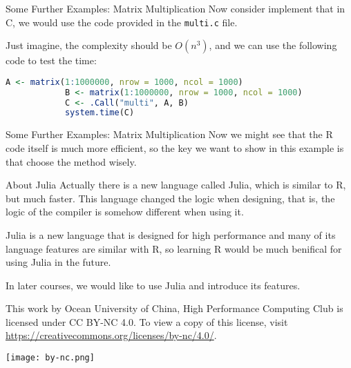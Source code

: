 \documentclass[aspectratio=169]{beamer}
\begin{document}
    \begin{frame}[fragile]{Some Further Examples: Matrix Multiplication}
        Now consider implement that in C, we would use the code provided in the \texttt{multi.c} file.\par
        Just imagine, the complexity should be $O(n^3)$, and we can use the following code to test the time:\par
        \begin{lstlisting}[language=R]
            A <- matrix(1:1000000, nrow = 1000, ncol = 1000)
            B <- matrix(1:1000000, nrow = 1000, ncol = 1000)
            C <- .Call("multi", A, B)
            system.time(C)
        \end{lstlisting}
    \end{frame}

    \begin{frame}{Some Further Examples: Matrix Multiplication}
        Now we might see that the R code itself is much more efficient, so the key we want to show in this example is that choose the method wisely.\par
    \end{frame}

    \begin{frame}{About Julia}
        Actually there is a new language called Julia, which is similar to R, but much faster. This language changed the logic when designing, that is, the logic of the compiler is somehow different when using it.\par
        Julia is a new language that is designed for high performance and many of its language features are similar with R, so learning R would be much benifical for using Julia in the future.\par
        In later courses, we would like to use Julia and introduce its features.\par
    \end{frame}

    \begin{frame}
        \begin{center}
            This work by Ocean University of China, High Performance Computing Club is licensed under CC BY-NC 4.0. To view a copy of this license, visit \url{https://creativecommons.org/licenses/by-nc/4.0/}.\par
            \texttt{[image: by-nc.png]}
        \end{center}
    \end{frame}
\end{document}
